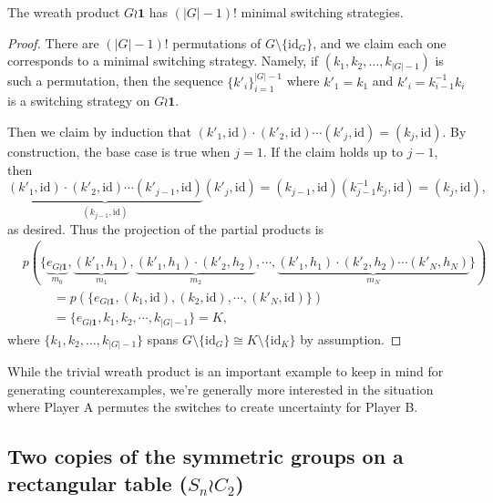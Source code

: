 \begin{proposition}
  The wreath product $G \wr \mathbf{1}$ has $(|G|-1)!$ minimal switching
  strategies.
\end{proposition}
\begin{proof}
  There are $(|G| - 1)!$ permutations of $G \setminus \{\mathrm{id}_G\}$, and
  we claim each one corresponds to a minimal switching strategy. Namely,
  if $(k_1, k_2, \dots, k_{|G|-1})$ is such a permutation, then
  the sequence $\{k'_i\}_{i=1}^{|G|-1}$ where $k'_1 = k_1$ and
  $k'_i = k_{i-1}^{-1}k_i$ is a switching strategy on $G \wr \mathbf{1}$.

  Then we claim by induction that
  $(k'_1, \mathrm{id})\cdot(k'_2, \mathrm{id})\cdots(k'_j, \mathrm{id}) = (k_j, \mathrm{id})$.
  By construction, the base case is true when $j = 1$. If the claim holds up to
  $j-1$, then \[
    \underbrace{
      (k'_1, \mathrm{id})\cdot(k'_2, \mathrm{id})\cdots(k'_{j-1}, \mathrm{id})
    }_{(k_{j-1}, \mathrm{id})}
    (k'_j, \mathrm{id})
    = (k_{j-1}, \mathrm{id})(k_{j-1}^{-1}k_j, \mathrm{id})
    = (k_j, \mathrm{id}),
  \] as desired.
  Thus the projection of the partial products is
  \begin{align}
    &p(\{
      \underbrace{e_{G \wr \mathbf{1}}}_{m_0},
      \underbrace{(k'_1, h_1)}_{m_1},
      \underbrace{(k'_1, h_1)\cdot(k'_2, h_2)}_{m_2},
      \cdots,
      \underbrace{(k'_1, h_1)\cdot(k'_2, h_2)\cdots(k'_N, h_N)}_{m_N}
    \}) \\
    & \hspace{1cm} =
    p(\{
      e_{G \wr \mathbf{1}},
      (k_1, \mathrm{id}),
      (k_2, \mathrm{id}),
      \cdots,
      (k'_N, \mathrm{id})
    \}) \\
    & \hspace{1cm} = \{e_{G \wr \mathbf{1}}, k_1, k_2, \cdots,k_{|G|-1}\} = K,
  \end{align}
  where $\{k_1, k_2, \dots, k_{|G|-1}\}$ spans
  $G \setminus \{\mathrm{id}_G\} \cong K \setminus \{\mathrm{id}_K\}$ by
  assumption.
\end{proof}

While the trivial wreath product is an important example to keep in mind for
generating counterexamples, we're generally more interested in the situation
where Player A permutes the switches to create uncertainty for Player B.

\subsection{Two copies of the symmetric groups on a rectangular table (\texorpdfstring{$S_n \wr C_2$}{Sn wr C2})}

